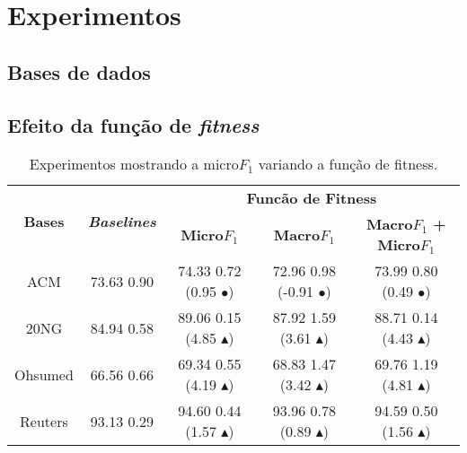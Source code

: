 \newcommand{\triangOK}{\textcolor[rgb]{00,0.45,0.10}{$\blacktriangle$}}
\newcommand{\triangBAD}{\textcolor[rgb]{0.7,00,00}{$\blacktriangledown$}}
\newcommand{\ball}{\textcolor[rgb]{0.7,0.70,0.0}{$\bullet$}}
 	

\chapter{Experimentos}
\label{cap::experimentos}

\section{Bases de dados}


\section{Efeito da função de \textit{fitness}}

\begin{table}
\centering
\caption{Experimentos mostrando a micro$F_1$ variando a função de fitness.}
\label{tab::fitness-micro}
\begin{footnotesize}
\begin{tabular}{|c|c|c|c|c|}
\toprule
\multirow{2}{*}{\textbf{Bases}} & \multirow{2}{*}{\textbf{\textit{Baselines}}} & \multicolumn{3}{c|}{\textbf{Funcão de Fitness}}\tabularnewline
\cline{3-5} 
 &  & \textbf{Micro$F_1$} & \textbf{Macro$F_1$} & \textbf{Macro$F_1$ + Micro$F_1$}\tabularnewline
\midrule
ACM & 73.63 \textpm{} 0.90 & 74.33 \textpm{} 0.72 (0.95 \ball) & 72.96 \textpm{} 0.98 (-0.91 \ball) & 73.99 \textpm{} 0.80 (0.49 \ball)\tabularnewline
\hline 
20NG & 84.94 \textpm{} 0.58 & 89.06 \textpm{} 0.15 (4.85 \triangOK) & 87.92 \textpm{} 1.59 (3.61 \triangOK) & 88.71 \textpm{} 0.14 (4.43 \triangOK)\tabularnewline
\hline 
Ohsumed & 66.56 \textpm{} 0.66 & 69.34 \textpm{} 0.55 (4.19 \triangOK) & 68.83 \textpm{} 1.47 (3.42 \triangOK) & 69.76 \textpm{} 1.19 (4.81 \triangOK)\tabularnewline
\hline 
Reuters & 93.13 \textpm{} 0.29 & 94.60 \textpm{} 0.44 (1.57 \triangOK) & 93.96 \textpm{} 0.78 (0.89 \triangOK) & 94.59 \textpm{} 0.50 (1.56 \triangOK)\tabularnewline
\bottomrule
\end{tabular}
\end{footnotesize}
\end{table}



